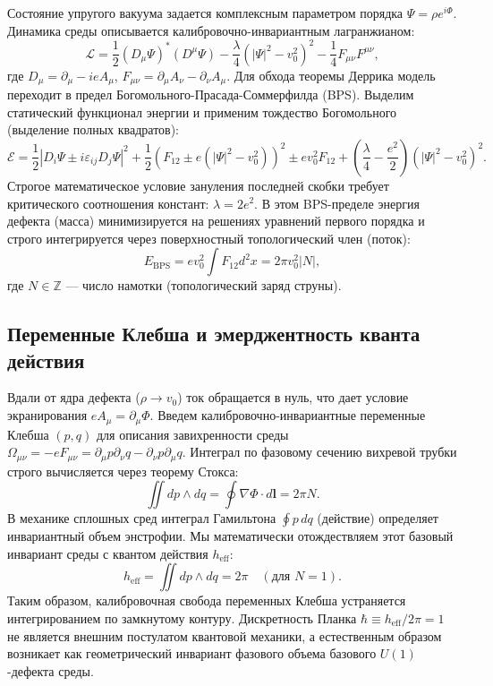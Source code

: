 \documentclass[11pt,a4paper]{article}
\begin{document}
Состояние упругого вакуума задается комплексным параметром порядка $\Psi = \rho e^{i\Phi}$. Динамика среды описывается калибровочно-инвариантным лагранжианом:
\begin{equation}
\mathcal{L} = \frac{1}{2} (D_\mu \Psi)^* (D^\mu \Psi) - \frac{\lambda}{4} (|\Psi|^2 - v_0^2)^2 - \frac{1}{4} F_{\mu\nu} F^{\mu\nu},
\label{eq:lagrangian}
\end{equation}
где $D_\mu = \partial_\mu - i e A_\mu$, $F_{\mu\nu} = \partial_\mu A_\nu - \partial_\nu A_\mu$. 
Для обхода теоремы Деррика модель переходит в предел Богомольного-Прасада-Соммерфилда (BPS). Выделим статический функционал энергии и применим тождество Богомольного (выделение полных квадратов):
\begin{equation}
\mathcal{E} = \frac{1}{2} |D_i \Psi \pm i \varepsilon_{ij} D_j \Psi|^2 + \frac{1}{2} \left(F_{12} \pm e(|\Psi|^2 - v_0^2)\right)^2 \pm e v_0^2 F_{12} + \left(\frac{\lambda}{4} - \frac{e^2}{2}\right) (|\Psi|^2 - v_0^2)^2.
\end{equation}
Строгое математическое условие зануления последней скобки требует критического соотношения констант: $\lambda = 2e^2$. В этом BPS-пределе энергия дефекта (масса) минимизируется на решениях уравнений первого порядка и строго интегрируется через поверхностный топологический член (поток):
\begin{equation}
E_{\text{BPS}} = e v_0^2 \int F_{12} d^2x = 2\pi v_0^2 |N|,
\end{equation}
где $N \in \mathbb{Z}$ — число намотки (топологический заряд струны).

\subsection{Переменные Клебша и эмерджентность кванта действия}
Вдали от ядра дефекта ($\rho \to v_0$) ток обращается в нуль, что дает условие экранирования $e A_\mu = \partial_\mu \Phi$. Введем калибровочно-инвариантные переменные Клебша $(p, q)$ для описания завихренности среды $\Omega_{\mu\nu} = -e F_{\mu\nu} = \partial_\mu p \partial_\nu q - \partial_\nu p \partial_\mu q$.
Интеграл по фазовому сечению вихревой трубки строго вычисляется через теорему Стокса:
\begin{equation}
\iint dp \wedge dq = \oint \nabla \Phi \cdot d\mathbf{l} = 2\pi N.
\end{equation}
В механике сплошных сред интеграл Гамильтона $\oint p \, dq$ (действие) определяет инвариантный объем энстрофии. Мы математически отождествляем этот базовый инвариант среды с квантом действия $h_{\text{eff}}$:
\begin{equation}
h_{\text{eff}} = \iint dp \wedge dq = 2\pi \quad (\text{для } N=1).
\end{equation}
Таким образом, калибровочная свобода переменных Клебша устраняется интегрированием по замкнутому контуру. Дискретность Планка $\hbar \equiv h_{\text{eff}}/2\pi = 1$ не является внешним постулатом квантовой механики, а естественным образом возникает как геометрический инвариант фазового объема базового $U(1)$-дефекта среды.
	
\end{document}
